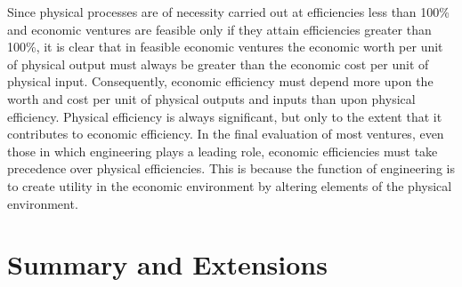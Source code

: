 Since physical processes are of necessity carried out at efficiencies less than 100\% and economic ventures are feasible only if they attain efficiencies greater than 100\%, it is clear that in feasible economic ventures the economic worth per unit of physical output must always be greater than the economic cost per unit of physical input. Consequently, economic efficiency must depend more upon the worth and cost per unit of physical outputs and inputs than upon physical efficiency. Physical efficiency is always significant, but only to the extent that it contributes to economic efficiency.
In the final evaluation of most ventures, even those in which engineering plays a leading role, economic efficiencies must take precedence over physical efficiencies. This is because the function of engineering is to create utility in the economic environment by altering elements of the physical environment.


\section{Summary and Extensions}


\begin{exercises}
    \begin{exercise}
    \label{sea-4-1}
    
    \end{exercise}
    \begin{solution}
    \end{solution}

\end{exercises}
